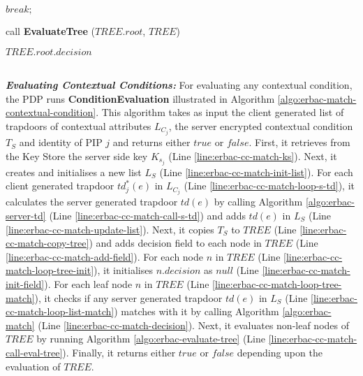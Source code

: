 \documentclass[epsfig,a4paper,11pt,titlepage]{book}
\numberwithin{algorithm}{chapter}
\newcommand{\algofontsize}{\fontsize{11}{12}\selectfont}
\begin{document}
\begin{algorithm} [htp]
{\begin{algorithmic}[1]
		 \label{line:erbac-cc-match-if-success}
		
			\State $\mathit{break;}$ \label{line:erbac-cc-match-stop}
			
		\EndIf  
	
	\EndFor

\EndFor

\State call \textbf{EvaluateTree} ($\mathit{TREE.root}$, $\mathit{TREE}$) {\algofontsize {}} \label{line:erbac-cc-match-call-eval-tree}

\Return $\mathit{TREE.root.decision}$ 

\end{algorithmic}
}
\end{algorithm}
\noindent \\
\noindent \emph{\textbf{Evaluating Contextual Conditions:}}
For evaluating any contextual condition, the \gls{PDP} runs \textbf{ConditionEvaluation} illustrated in Algorithm \ref{algo:erbac-match-contextual-condition}. This algorithm takes as input the client generated list of trapdoors of contextual attributes $L_{C_j}$, the server encrypted contextual condition $T_{S}$ and identity of \gls{PIP} $j$ and returns either $\mathit{true}$ or $\mathit{false}$. First, it retrieves from the Key Store the server side key $K_{s_j}$ (Line \ref{line:erbac-cc-match-ks}). Next, it creates and initialises a new list $L_{S}$ (Line \ref{line:erbac-cc-match-init-list}). For each client generated trapdoor $td^*_j (e)$ in $L_{C_j}$ (Line \ref{line:erbac-cc-match-loop-s-td}), it calculates the server generated trapdoor $td(e)$ by calling Algorithm \ref{algo:erbac-server-td} (Line \ref{line:erbac-cc-match-call-s-td}) and adds $td(e)$ in $L_{S}$ (Line \ref{line:erbac-cc-match-update-list}). Next, it copies $T_{S}$ to $\mathit{TREE}$ (Line \ref{line:erbac-cc-match-copy-tree}) and adds decision field to each node in $\mathit{TREE}$ (Line \ref{line:erbac-cc-match-add-field}). For each node $n$ in $\mathit{TREE}$ (Line \ref{line:erbac-cc-match-loop-tree-init}), it initialises $n.decision$ as $null$ (Line \ref{line:erbac-cc-match-init-field}). For each leaf node $n$ in $\mathit{TREE}$ (Line \ref{line:erbac-cc-match-loop-tree-match}), it checks if any server generated trapdoor $td(e)$ in $L_{S}$ (Line \ref{line:erbac-cc-match-loop-list-match}) matches with it by calling Algorithm \ref{algo:erbac-match} (Line \ref{line:erbac-cc-match-decision}). Next, it evaluates non-leaf nodes of $\mathit{TREE}$ by running Algorithm \ref{algo:erbac-evaluate-tree} (Line \ref{line:erbac-cc-match-call-eval-tree}). Finally, it returns either $\mathit{true}$ or $\mathit{false}$ depending upon the evaluation of $\mathit{TREE}$.
\end{document}
